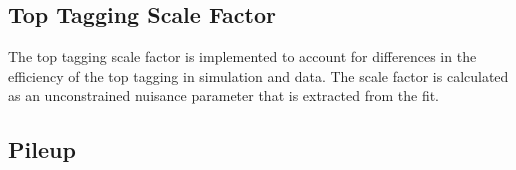 

%
%
%


\subsection{Top Tagging Scale Factor}

The top tagging scale factor is implemented to account for differences in the efficiency of the top tagging in simulation and data. The scale factor is calculated as an unconstrained nuisance parameter that is extracted from the fit.



\subsection{Pileup}

